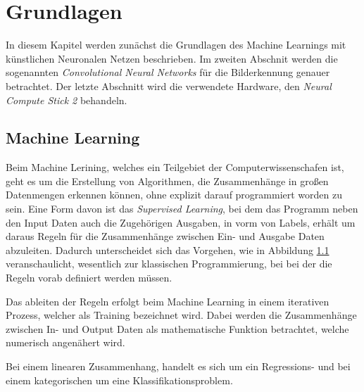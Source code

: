 \chapter{Grundlagen}\label{kap:grundlagen}


In diesem Kapitel werden zunächst die Grundlagen 
des Machine Learnings mit künstlichen Neuronalen Netzen 
beschrieben. Im zweiten Abschnit werden die sogenannten 
\textit{Convolutional Neural Networks} für die 
Bilderkennung genauer betrachtet.
Der letzte Abschnitt wird die verwendete Hardware,
den \textit{Neural Compute Stick 2} behandeln.



\section{Machine Learning}\label{sec:ml}

Beim Machine Lerining, welches ein Teilgebiet der Computerwissenschafen
ist, geht es um die Erstellung von Algorithmen, die Zusammenhänge in 
großen Datenmengen erkennen können, ohne explizit darauf programmiert
worden zu sein.
Eine Form davon ist das \textit{Supervised Learning}, bei dem das Programm 
neben den Input Daten auch die Zugehörigen Ausgaben, in vorm von 
Labels, erhält um daraus 
Regeln für die Zusammenhänge zwischen Ein- und Ausgabe Daten abzuleiten.
Dadurch unterscheidet sich das Vorgehen, wie in Abbildung 
\ref{fig:ml_classic_programm} veranschaulicht, wesentlich zur klassischen 
Programmierung, bei bei der die Regeln vorab definiert werden müssen.

\vspace{1cm}
\begin{figure}[H]
    \centering
    
    \caption{}
    \label{fig:ml_classic_programm}
\end{figure}
\vspace{1cm}


Das ableiten der Regeln erfolgt beim Machine Learning in einem 
iterativen Prozess, welcher als Training bezeichnet wird.
Dabei werden die Zusammenhänge zwischen In- und Output Daten 
als mathematische Funktion betrachtet, welche numerisch 
angenähert wird.

Bei einem linearen Zusammenhang, handelt es sich
um ein Regressions- und bei einem kategorischen um 
eine Klassifikationsproblem.

